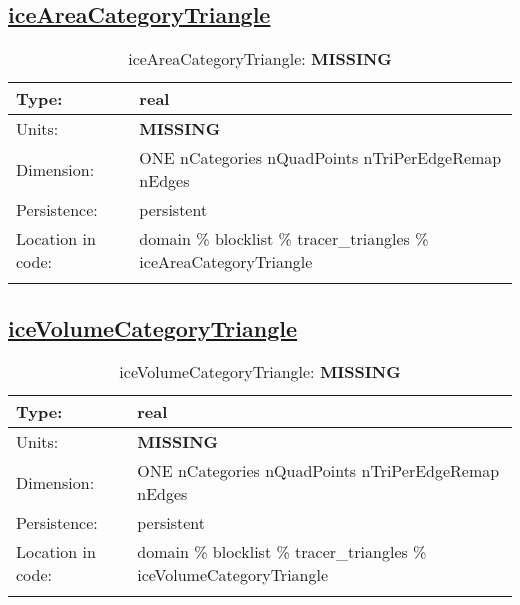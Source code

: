 \subsection[iceAreaCategoryTriangle]{\hyperref[sec:var_tab_tracer_triangles]{iceAreaCategoryTriangle}}
\label{subsec:var_sec_tracer_triangles_iceAreaCategoryTriangle}
\begin{center}
\begin{longtable}{| p{2.0in} | p{4.0in} |}
        \hline 
        Type: & real \\
        \hline 
        Units: & {\bf \color{red} MISSING} \\
        \hline 
        Dimension: & ONE nCategories nQuadPoints nTriPerEdgeRemap nEdges \\
        \hline 
        Persistence: & persistent \\
        \hline 
         Location in code: & domain \% blocklist \% tracer\_triangles \% iceAreaCategoryTriangle \\
         \hline 
    \caption{iceAreaCategoryTriangle: {\bf \color{red} MISSING}}
\end{longtable}
\end{center}
\subsection[iceVolumeCategoryTriangle]{\hyperref[sec:var_tab_tracer_triangles]{iceVolumeCategoryTriangle}}
\label{subsec:var_sec_tracer_triangles_iceVolumeCategoryTriangle}
\begin{center}
\begin{longtable}{| p{2.0in} | p{4.0in} |}
        \hline 
        Type: & real \\
        \hline 
        Units: & {\bf \color{red} MISSING} \\
        \hline 
        Dimension: & ONE nCategories nQuadPoints nTriPerEdgeRemap nEdges \\
        \hline 
        Persistence: & persistent \\
        \hline 
         Location in code: & domain \% blocklist \% tracer\_triangles \% iceVolumeCategoryTriangle \\
         \hline 
    \caption{iceVolumeCategoryTriangle: {\bf \color{red} MISSING}}
\end{longtable}
\end{center}

